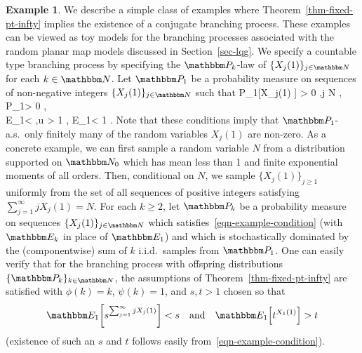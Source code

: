 \documentclass[11pt]{article}
\theoremstyle{plain}
\theoremstyle{definition}
\newtheorem{example}[thm]{Example}
\numberwithin{equation}{section}
\def\allb#1\alle{\begin{align}#1\end{align}}
\newcommand{\eqbn}{\begin{equation*}}
\newcommand{\eqen}{\end{equation*}}
\newcommand{\BB}{\mathbbm}
\let\originalleft\left
\let\originalright\right
\renewcommand{\left}{\mathopen{}\mathclose\bgroup\originalleft}
\renewcommand{\right}{\aftergroup\egroup\originalright}
\begin{document}
 
\begin{example} \label{example-ctble}
We describe a simple class of examples where Theorem~\ref{thm-fixed-pt-infty} implies the existence of a conjugate branching process. These examples can be viewed as toy models for the branching processes associated with the random planar map models discussed in Section~\ref{sec-lqg}.  
We specify a countable type branching process by specifying the $\BB P_k$-law of $\{X_j(1)\}_{j\in\BB N}$ for each $k\in \BB N$.
Let $\BB P_1$ be a probability measure on sequences of non-negative integers $\{X_j(1)\}_{j\in\BB N}$ such that 
\allb  \label{eqn-example-condition}
\BB P_1[X_j(1)  ] > 0 ,\quad \forall j \in \BB N ,  \quad 
\BB P_1\left[  X_1(1) \geq 2 \right] > 0 , \notag\\
\BB E_1\left[ u^{\sum_{j=1}^\infty j X_j(1)} \right] < \infty ,\quad\forall u > 1 , \quad {} \quad 
\BB E_1\left[ \sum_{j=1}^\infty j X_j(1) \right] < 1 .
\alle 
Note that these conditions imply that $\BB P_1$-a.s.\ only finitely many of the random variables $X_j(1)$ are non-zero. 
As a concrete example, we can first sample a random variable $N$ from a distribution supported on $\BB N_0$ which has mean less than 1 and finite exponential moments of all orders. Then, conditional on $N$, we sample $\{X_j(1)\}_{j\geq 1}$ uniformly from the set of all sequences of positive integers satisfying $\sum_{j=1}^\infty j X_j(1) = N$. 
For each $k\geq 2$, let $\BB P_k$ be a probability measure on sequences $\{X_j(1)\}_{j\in\BB N}$ which satisfies~\eqref{eqn-example-condition} (with $\BB E_k$ in place of $\BB E_1$) and which is stochastically dominated by the (componentwise) sum of $k$ i.i.d.\ samples from $\BB P_1$.  
One can easily verify that for the branching process with offspring distributions $\{\BB P_k\}_{k\in\BB N}$, the assumptions of Theorem~\ref{thm-fixed-pt-infty} are satisfied with $\phi(k) =k$, $\psi(k) = 1$, and $s,t > 1$ chosen so that
\eqbn
\BB E_1\left[ s^{ \sum_{j=1}^\infty j X_j(1) } \right] < s \quad \text{and} \quad
\BB E_1\left[ t^{  X_1(1) } \right]  > t  
\eqen
(existence of such an $s$ and $t$ follows easily from~\eqref{eqn-example-condition}).
\end{example}
\end{document}
